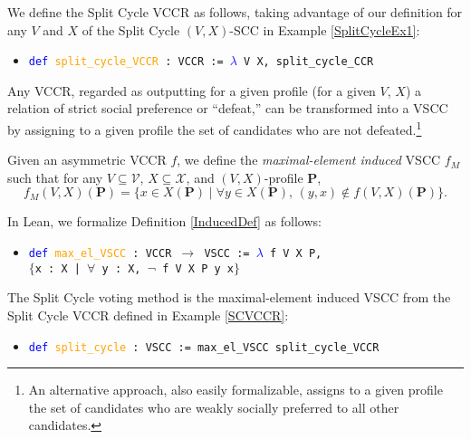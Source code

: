 \documentclass[runningheads]{llncs}
\begin{document}
\begin{example}\label{SCVCCR} We define the Split Cycle VCCR as follows, taking advantage of our definition for any $V$ and $X$ of the Split Cycle $(V,X)$-SCC in Example \ref{SplitCycleEx1}:
\begin{itemize}
\item[] \texttt{\textcolor{blue}{def} \textcolor{orange}{split\_cycle\_VCCR} : VCCR := \textcolor{blue}{$\lambda$} V X, split\_cycle\_CCR}
\end{itemize}
\end{example}

Any VCCR, regarded as outputting for a given profile (for a given $V$, $X$) a relation of strict social preference or ``defeat,'' can be transformed into a VSCC by assigning to a given profile the set of candidates who are not defeated.\footnote{An alternative approach, also easily formalizable, assigns to a given profile the set of candidates who are weakly socially preferred to all other candidates.}

\begin{definition}\label{InducedDef} \textnormal{Given an asymmetric VCCR $f$, we define the \textit{maximal-element induced} VSCC $f_{M}$ such that for any $V\subseteq\mathcal{V}$, $X\subseteq\mathcal{X}$, and $(V,X)$-profile $\mathbf{P}$, \[f_{M}(V,X)(\mathbf{P})=\{x\in X(\mathbf{P})\mid \forall y\in X(\mathbf{P}),\, (y,x)\not\in f(V,X)(\mathbf{P})\}.\]}
\end{definition}
In Lean, we formalize Definition \ref{InducedDef} as follows:
\begin{itemize}
\item[] \texttt{\textcolor{blue}{def} \textcolor{orange}{max\_el\_VSCC} : VCCR $\to$ VSCC := \textcolor{blue}{$\lambda$} f V X P,} \\
\texttt{$\{$x : X | $\forall$ y : X, $\neg$ f V X P y x$\}$}
\end{itemize}

\begin{example} The Split Cycle voting method \cite{HP2020b} is the maximal-element induced VSCC from the Split Cycle VCCR defined in Example \ref{SCVCCR}: 
\begin{itemize}
\item[] \texttt{\textcolor{blue}{def} \textcolor{orange}{split\_cycle} : VSCC := max\_el\_VSCC split\_cycle\_VCCR}
\end{itemize}
\end{example}
\end{document}
